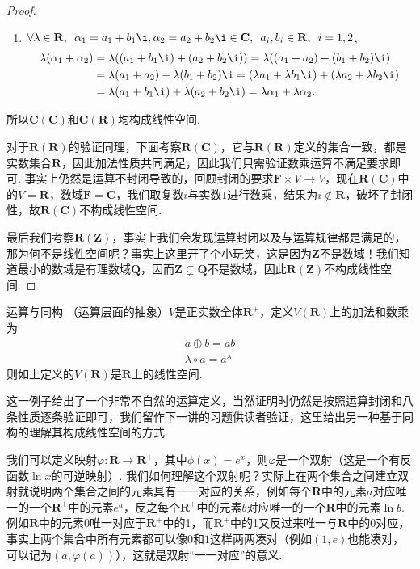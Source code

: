 \begin{proof}
\begin{enumerate}
        \item $\forall \lambda \in \mathbf{R},\enspace \alpha_1 = a_1+b_1\i, \alpha_2 = a_2+b_2\i \in \mathbf{C},\enspace a_i, b_i \in \mathbf{R},\enspace i = 1, 2$,
              \begin{align*}
                  \lambda(\alpha_1+\alpha_2)
                   & = \lambda((a_1+b_1\i)+(a_2+b_2\i)) = \lambda((a_1+a_2)+(b_1+b_2)\i)                             \\
                   & = \lambda(a_1+a_2)+\lambda(b_1+b_2)\i = (\lambda a_1+\lambda b_1\i)+(\lambda a_2+\lambda b_2\i) \\
                   & = \lambda(a_1+b_1\i)+\lambda(a_2+b_2\i) = \lambda \alpha_1 + \lambda \alpha_2.
              \end{align*}
    \end{enumerate}
    所以$\mathbf{C}(\mathbf{C})$和$\mathbf{C}(\mathbf{R})$均构成线性空间.

    对于$\mathbf{R(R)}$的验证同理，下面考察$\mathbf{R}(\mathbf{C})$，它与$\mathbf{R(R)}$定义的集合一致，都是实数集合$\mathbf{R}$，因此加法性质共同满足，因此我们只需验证数乘运算不满足要求即可. 事实上仍然是运算不封闭导致的，回顾封闭的要求$\mathbf{F}\times V\to V$，现在$\mathbf{R(C)}$中的$V=\mathbf{R}$，数域$\mathbf{F}=\mathbf{C}$，我们取复数$i$与实数$1$进行数乘，结果为$i\notin\mathbf{R}$，破坏了封闭性，故$\mathbf{R(C)}$不构成线性空间.

    最后我们考察$\mathbf{R(Z)}$，事实上我们会发现运算封闭以及与运算规律都是满足的，那为何不是线性空间呢？事实上这里开了个小玩笑，这是因为$\mathbf{Z}$不是数域！我们知道最小的数域是有理数域$\mathbf{Q}$，因而$\mathbf{Z}\subsetneq\mathbf{Q}$不是数域，因此$\mathbf{R(Z)}$不构成线性空间.
\end{proof}

\begin{example}{}{运算与同构}
    （运算层面的抽象）$V$是正实数全体$\mathbf{R}^+$，定义$V(\mathbf{R})$上的加法和数乘为
    \begin{gather*}
        a\oplus b=ab \\
        \lambda\circ a=a^\lambda
    \end{gather*}
    则如上定义的$V(\mathbf{R})$是$\mathbf{R}$上的线性空间.
\end{example}

这一例子给出了一个非常不自然的运算定义，当然证明时仍然是按照运算封闭和八条性质逐条验证即可，我们留作下一讲的习题供读者验证，这里给出另一种基于同构的理解其构成线性空间的方式.

我们可以定义映射$\varphi:\mathbf{R}\to\mathbf{R}^+$，其中$\phi(x)=e^x$，则$\varphi$是一个双射（这是一个有反函数$\ln x$的可逆映射）. 我们如何理解这个双射呢？实际上在两个集合之间建立双射就说明两个集合之间的元素具有一一对应的关系，例如每个$\mathbf{R}$中的元素$a$对应唯一的一个$\mathbf{R}^+$中的元素$e^a$，反之每个$\mathbf{R}^+$中的元素$b$对应唯一的一个$\mathbf{R}$中的元素$\ln b$. 例如$\mathbf{R}$中的元素$0$唯一对应于$\mathbf{R}^+$中的1，而$\mathbf{R}^+$中的1又反过来唯一与$\mathbf{R}$中的$0$对应，事实上两个集合中所有元素都可以像$0$和$1$这样两两凑对（例如$(1,e)$也能凑对，可以记为$(a,\varphi(a))$），这就是双射``一一对应''的意义.

